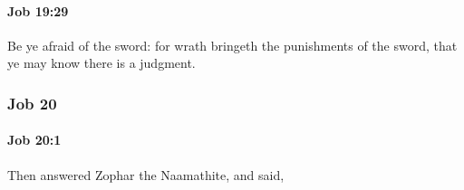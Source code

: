 		\paragraph{Job 19:29} %
			\label{JOB-19-29}

			Be ye afraid of the sword: for wrath bringeth the punishments of the sword, that ye may know there is a judgment.

	\subsubsection{Job 20} %
		\label{JOB-20}

		\paragraph{Job 20:1} %
			\label{JOB-20-1}

			Then answered Zophar the Naamathite, and said,


